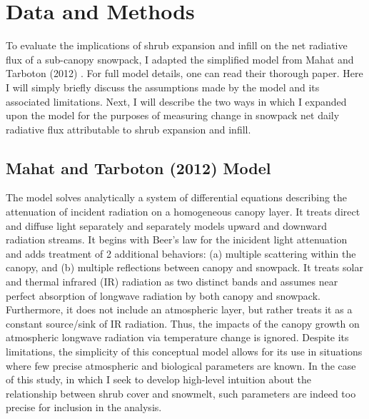\documentclass[
10pt, %
letterpaper, %
oneside, %
headinclude,footinclude, %
BCOR5mm, %
]{scrartcl}
\begin{document}
 

\section{Data and Methods}

To evaluate the implications of shrub expansion and infill on the net radiative flux of a sub-canopy snowpack, I adapted the simplified model from Mahat and Tarboton (2012) \cite{mahat_canopy_2012}. For full model details, one can read their thorough paper. Here I will simply briefly discuss the assumptions made by the model and its associated limitations. Next, I will describe the two ways in which I expanded upon the model for the purposes of measuring change in snowpack net daily radiative flux attributable to shrub expansion and infill.

\subsection{Mahat and Tarboton (2012) Model}


The model solves analytically a system of differential equations describing the attenuation of incident radiation on a homogeneous canopy layer. It treats direct and diffuse light separately and separately models upward and downward radiation streams. It begins with Beer's law for the inicident light attenuation and adds treatment of 2 additional behaviors: (a) multiple scattering within the canopy, and (b) multiple reflections between canopy and snowpack. It treats solar and thermal infrared (IR) radiation as two distinct bands and assumes near perfect absorption of longwave radiation by both canopy and snowpack. Furthermore, it does not include an atmospheric layer, but rather treats it as a constant source/sink of IR radiation. Thus, the impacts of the canopy growth on atmospheric longwave radiation via temperature change is ignored. Despite its limitations, the simplicity of this conceptual model allows for its use in situations where few precise atmospheric and biological parameters are known. In the case of this study, in which I seek to develop high-level intuition about the relationship between shrub cover and snowmelt, such parameters are indeed too precise for inclusion in the analysis.
\end{document}
